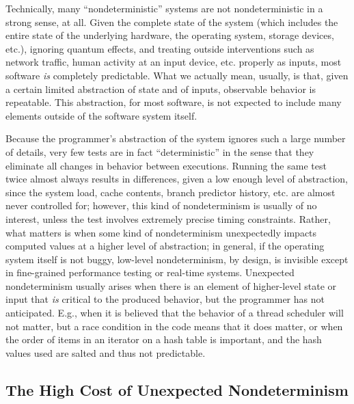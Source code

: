 Technically, many ``nondeterministic'' systems are not
nondeterministic in a strong sense, at all.  Given the complete state
of the system (which includes the entire state of the underlying
hardware, the operating system, storage devices, etc.), ignoring
quantum effects, and treating outside interventions such as network
traffic, human activity at an input device, etc. properly as inputs,
most software \emph{is} completely predictable.  What we actually
mean, usually, is that, given a certain limited abstraction of state
and of inputs, observable behavior is repeatable.  This abstraction,
for most software, is not expected to include many elements outside of
the software system itself.

Because the
programmer's abstraction of the system ignores  such a large number of
details, very few tests are in fact ``deterministic'' in the sense
that they eliminate all changes in behavior between executions.  Running the same test
twice almost always results in differences, given a low enough level of
abstraction, since the system load,
cache contents, branch predictor history, etc. are almost never
controlled for; however, this kind of
nondeterminism is usually of no interest, unless the test involves
extremely precise timing constraints.  Rather, what matters is when
some kind of nondeterminism unexpectedly impacts computed values at a
higher level of abstraction; in general, if the operating system
itself is not buggy, low-level nondeterminism, by design, is invisible
except in fine-grained performance testing or real-time systems.
Unexpected nondeterminism usually arises when there is an element of higher-level
state or input that \emph{is} critical to the produced behavior, but
the programmer has not anticipated.  E.g.,  when it is believed that the
behavior of a thread scheduler will not matter, but a race condition
in the code means that it does matter, or when the order of items in
an iterator on a hash table is important, and the hash values used are
salted and thus not predictable.

\subsection{The High Cost of Unexpected Nondeterminism}

